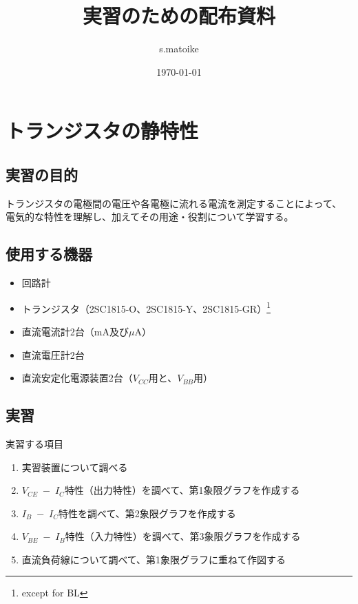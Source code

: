 \documentclass[uplatex,a4paper,11pt,oneside,openany]{jsbook}
\begin{document}
\title{実習のための配布資料}
\author{s.matoike}
\date{\today}
\maketitle

\newpage

\chapter{トランジスタの静特性}

\section{実習の目的}

トランジスタの電極間の電圧や各電極に流れる電流を測定することによって、
電気的な特性を理解し、加えてその用途・役割について学習する。

\section{使用する機器}

\begin{itemize}
\item 回路計
\item トランジスタ（2SC1815-O、2SC1815-Y、2SC1815-GR）\footnote{except for BL}
\item 直流電流計2台（mA及び$\mu$A）
\item 直流電圧計2台
\item 直流安定化電源装置2台（$V_{CC}$用と、$V_{BB}$用）
\end{itemize}

\section{実習}

実習する項目
\begin{enumerate}
\item[(1)] 実習装置について調べる
\item[(2)] $V_{CE}\;-\;I_C$特性（出力特性）を調べて、第1象限グラフを作成する
\item[(3)] $I_B\;-\;I_C$特性を調べて、第2象限グラフを作成する
\item[(4)] $V_{BE}\;-\;I_B$特性（入力特性）を調べて、第3象限グラフを作成する
\item[(5)] 直流負荷線について調べて、第1象限グラフに重ねて作図する
\end{enumerate}
\end{document}
